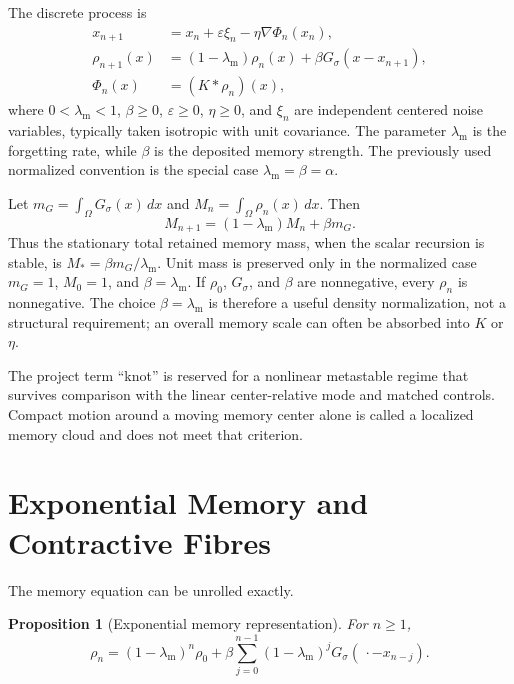 \documentclass[preprint,amsmath,amssymb,aps,prd,nofootinbib,floatfix]{revtex4-2}
\newtheorem{proposition}{Proposition}
\begin{document}
The discrete process is
\begin{align}
x_{n+1}
&=x_n+\varepsilon\xi_n-\eta\nabla\Phi_n(x_n),
\label{eq:xupdate}\\
\rho_{n+1}(x)
&=(1-\lambda_{\mathrm m})\rho_n(x)
+\beta G_\sigma(x-x_{n+1}),
\label{eq:rhoupdate}\\
\Phi_n(x)&=(K*\rho_n)(x),
\label{eq:potential}
\end{align}
where $0<\lambda_{\mathrm m}<1$, $\beta\geq0$, $\varepsilon\geq0$,
$\eta\geq0$, and $\xi_n$ are independent centered noise variables, typically
taken isotropic with unit covariance. The parameter $\lambda_{\mathrm m}$ is
the forgetting rate, while $\beta$ is the deposited memory strength. The
previously used normalized convention is the special case
$\lambda_{\mathrm m}=\beta=\alpha$.

Let $m_G=\int_\Omega G_\sigma(x)\,dx$ and $M_n=\int_\Omega\rho_n(x)\,dx$.
Then
\begin{equation}
M_{n+1}=(1-\lambda_{\mathrm m})M_n+\beta m_G.
\label{eq:massrecursion}
\end{equation}
Thus the stationary total retained memory mass, when the scalar recursion is
stable, is $M_*=\beta m_G/\lambda_{\mathrm m}$. Unit mass is preserved only in
the normalized case $m_G=1$, $M_0=1$, and $\beta=\lambda_{\mathrm m}$. If
$\rho_0$, $G_\sigma$, and $\beta$ are nonnegative, every $\rho_n$ is
nonnegative. The choice $\beta=\lambda_{\mathrm m}$ is therefore a useful
density normalization, not a structural requirement; an overall memory scale
can often be absorbed into $K$ or $\eta$.

The project term ``knot'' is reserved for a nonlinear metastable regime that
survives comparison with the linear center-relative mode and matched controls.
Compact motion around a moving memory center alone is called a localized
memory cloud and does not meet that criterion.

\section{Exponential Memory and Contractive Fibres}
\label{sec:memory}

The memory equation can be unrolled exactly.

\begin{proposition}[Exponential memory representation]
For $n\geq1$,
\begin{equation}
\rho_n
=(1-\lambda_{\mathrm m})^n\rho_0
+\beta\sum_{j=0}^{n-1}(1-\lambda_{\mathrm m})^j
G_\sigma(\,\cdot-x_{n-j}).
\label{eq:memoryexpansion}
\end{equation}
\end{proposition}
\end{document}
